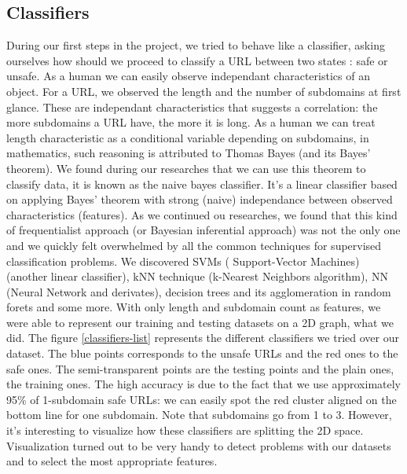 \documentclass[conference,11pt]{IEEEtran}
\begin{document}
\subsection{Classifiers}
During our first steps in the project, we tried to behave like a classifier,
asking ourselves how should we proceed to classify a URL between two states :
safe or unsafe. As a human we can easily observe independant characteristics of
an object. For a URL, we observed the length and the number of subdomains at
first glance. These are independant characteristics that suggests a correlation:
the more subdomains a URL have, the more it is long. As a human we can treat
length characteristic as a conditional variable depending on subdomains, in
mathematics, such reasoning is attributed to Thomas Bayes (and its Bayes'
theorem). We found during our researches that we can use this theorem to
classify data, it is known as the naive bayes classifier. It's a linear
classifier based on applying Bayes' theorem with strong (naive) independance
between observed characteristics (features). As we continued ou researches, we
found that this kind of frequentialist approach (or Bayesian inferential
approach) was not the only one and we quickly felt overwhelmed by all the common
techniques for supervised classification problems. We discovered SVMs (%
Support-Vector Machines) (another linear classifier), kNN technique (k-Nearest
Neighbors algorithm), NN (Neural Network and derivates), decision trees and
its agglomeration in random forets and some more. With only length and subdomain
count as features, we were able to represent our training and testing datasets
on a 2D graph, what we did. The figure \ref{classifiers-list} represents the
different classifiers we tried over our dataset. The blue points corresponds to
the unsafe URLs and the red ones to the safe ones. The semi-transparent points
are the testing points and the plain ones, the training ones. The high accuracy
is due to the fact that we use approximately 95\% of 1-subdomain safe URLs: we
can easily spot the red cluster aligned on the bottom line for one subdomain.
Note that subdomains go from 1 to 3. However, it's interesting to visualize how
these classifiers are splitting the 2D space. Visualization turned out to be
very handy to detect problems with our datasets and to select the most
appropriate features.
\end{document}
